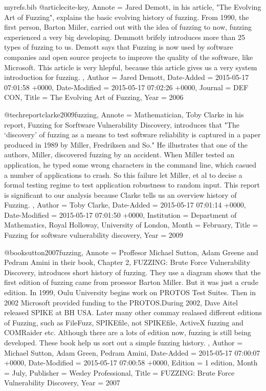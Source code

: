 \begin{filecontents}{myrefs.bib}
@article{cite-key,
	Annote = {Jared Demott, in his article, "The Evolving Art of Fuzzing", explains the basic evolving history of fuzzing. From 1990, the first person, Barton Miiler, carried out with the idea of fuzzing to now, fuzzing experienced a very big developing. Demmott brifely introduces more than 25 types of fuzzing to us. Demott says that Fuzzing is now used by software companies and open source projects to improve the quality of the software, like Microsoft. This article is very hlepful, because this article gives us a very system introduction for fuzzing.  },
	Author = {Jared Demott},
	Date-Added = {2015-05-17 07:01:58 +0000},
	Date-Modified = {2015-05-17 07:02:26 +0000},
	Journal = {DEF CON},
	Title = {The Evolving Art of Fuzzing},
	Year = {2006}}

@techreport{clarke2009fuzzing,
	Annote = {Mathematician, Toby Clarke in his report, Fuzzing for Sorftware Vulnerability Discovery, introduces that "The `discovery' of fuzzing as a means to test software reliability is captured in a paper produced in 1989 by Miller, Fredriksen and So." He illustrates that one of the authors, Miller, discovered fuzzing by an accident. When Miller tested an application, he typed some wrong characters in the command line, which casued a number of applications to crash. So this failure let Miller, et al to decise a formal testing regime to test application robustness to random input. This report is significant to our analysis because Clarke tells us an overview history of Fuzzing. },
	Author = {Toby Clarke},
	Date-Added = {2015-05-17 07:01:14 +0000},
	Date-Modified = {2015-05-17 07:01:50 +0000},
	Institution = {Department of Mathematics, Royal Holloway, University of London},
	Month = {February},
	Title = {Fuzzing for software vulnerability discovery},
	Year = {2009}}

@book{sutton2007fuzzing,
	Annote = {Proffesor Michael Sutton, Adam Greene and Pedram Amini in their book, Chapter 2, FUZZING: Brute Force Vulnerability Discovery, introduces short history of fuzzing. They use a diagram shows that the first edition of fuzzing came from proessor Barton Miller. But it was just a crude edition. In 1999, Oulu University begins work on PROTOS Test Suites. Then in 2002 Microsoft provided funding to the PROTOS.During 2002, Dave Aitel released SPIKE at BH USA. Later many other commay realased different editions of Fuzzing, such as FileFuzz, SPIKEfile, not SPIKEfile, ActiveX fuzzing and COMRaider etc. Although there are a lots of edition now, fuzzing is still  being developed. These book help us sort out a simple fuzzing history.  },
	Author = {Michael Sutton, Adam Green, Pedram Amini},
	Date-Added = {2015-05-17 07:00:07 +0000},
	Date-Modified = {2015-05-17 07:00:58 +0000},
	Edition = {1 edition},
	Month = {July},
	Publisher = {Wesley Professional},
	Title = {FUZZING: Brute Force Vulnerability Discovery},
	Year = {2007}}


\end{filecontents}
